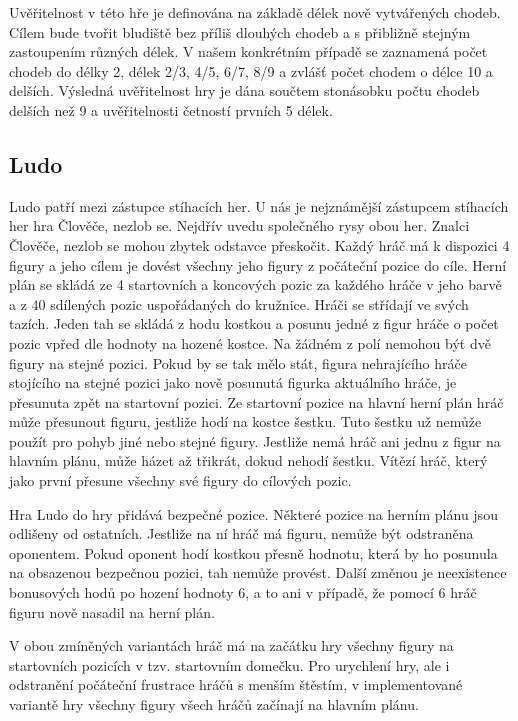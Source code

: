 Uvěřitelnost v této hře je definována na základě délek nově vytvářených chodeb. Cílem bude tvořit bludiště bez příliš dlouhých chodeb a s přibližně stejným zastoupením různých délek. V našem konkrétním případě se zaznamená počet chodeb do délky 2, délek 2/3, 4/5, 6/7, 8/9 a zvlášť počet chodem o délce 10 a delších. Výsledná uvěřitelnost hry je dána součtem stonásobku počtu chodeb delších než 9 a uvěřitelnosti četností prvních 5 délek.

\subsection{Ludo}

Ludo patří mezi zástupce stíhacích her. U nás je nejznámější zástupcem stíhacích her hra Člověče, nezlob se. Nejdřív uvedu společného rysy obou her. Znalci Člověče, nezlob se mohou zbytek odstavce přeskočit. Každý hráč má k dispozici 4 figury a jeho cílem je dovést všechny jeho figury z počáteční pozice do cíle. Herní plán se skládá ze 4 startovních a koncových pozic za každého hráče v jeho barvě a z 40 sdílených pozic uspořádaných do kružnice. Hráči se střídají ve svých tazích. Jeden tah se skládá z hodu kostkou a posunu jedné z figur hráče o počet pozic vpřed dle hodnoty na hozené kostce. Na žádném z polí nemohou být dvě figury na stejné pozici. Pokud by se tak mělo stát, figura nehrajícího hráče stojícího na stejné pozici jako nově posunutá figurka aktuálního hráče, je přesunuta zpět na startovní pozici. Ze startovní pozice na hlavní herní plán hráč může přesunout figuru, jestliže hodí na kostce šestku. Tuto šestku už nemůže použít pro pohyb jiné nebo stejné figury. Jestliže nemá hráč ani jednu z figur na hlavním plánu, může házet až třikrát, dokud nehodí šestku. Vítězí hráč, který jako první přesune všechny své figury do cílových pozic.

Hra Ludo do hry přidává bezpečné pozice. Některé pozice na herním plánu jsou odlišeny od ostatních. Jestliže na ní hráč má figuru, nemůže být odstraněna oponentem. Pokud oponent hodí kostkou přesně hodnotu, která by ho posunula na obsazenou bezpečnou pozici, tah nemůže provést. Další změnou je neexistence bonusových hodů po hození hodnoty 6, a to ani v případě, že pomocí 6 hráč figuru nově nasadil na herní plán.

V obou zmíněných variantách hráč má na začátku hry všechny figury na startovních pozicích v tzv. startovním domečku. Pro urychlení hry, ale i odstranění počáteční frustrace hráčů s menším štěstím, v implementované variantě hry všechny figury všech hráčů začínají na hlavním plánu.

